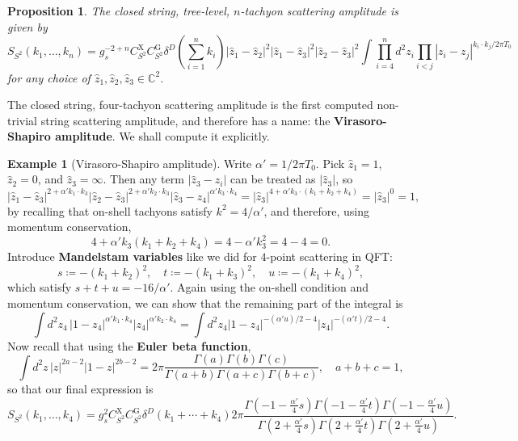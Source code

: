 \documentclass{report}
\theoremstyle{plain}
\newtheorem{proposition}[theorem]{Proposition}
\theoremstyle{definition}
\newtheorem{example}[theorem]{Example}
\theoremstyle{remark}
\newcommand{\bC}{\mathbb{C}}
\begin{document}
\begin{proposition}
  The closed string, tree-level, $n$-tachyon scattering amplitude is
  given by
  \[ S_{S^2}(k_1, \ldots, k_n) = g_s^{-2+n} C_{S^2}^{\text{X}} C_{S^2}^{\text{G}} \delta^D\left(\sum_{i=1}^n k_i\right) |\hat{z}_1 - \hat{z}_2|^2 |\hat{z}_1 - \hat{z}_3|^2 |\hat{z}_2 - \hat{z}_3|^2 \int \prod_{i=4}^n d^2 z_i \prod_{i<j} |z_i - z_j|^{k_i \cdot k_j/2\pi T_0} \]
  for any choice of $\hat{z}_1, \hat{z}_2, \hat{z}_3 \in \bC^2$.
\end{proposition}

The closed string, four-tachyon scattering amplitude is the first
computed non-trivial string scattering amplitude, and therefore has a
name: the {\bf Virasoro-Shapiro amplitude}. We shall compute it
explicitly.

\begin{example}[Virasoro-Shapiro amplitude]
  Write $\alpha' = 1/2\pi T_0$. Pick $\hat{z}_1 = 1$, $\hat{z}_2 = 0$,
  and $\hat{z}_3 = \infty$. Then any term $|\hat{z}_3 - z_i|$ can be
  treated as $|\hat{z}_3|$, so
  \[ |\hat{z}_1 - \hat{z}_3|^{2+\alpha' k_1\cdot k_3}|\hat{z}_2 - \hat{z}_3|^{2+\alpha' k_2 \cdot k_3}|\hat{z}_3 - z_4|^{\alpha' k_3 \cdot k_4} = |\hat{z}_3|^{4 + \alpha' k_3 \cdot (k_1 + k_2 + k_4)} = |\hat{z}_3|^0 = 1, \]
  by recalling that on-shell tachyons satisfy $k^2 = 4/\alpha'$, and
  therefore, using momentum conservation,
  \[ 4 + \alpha' k_3(k_1 + k_2 + k_4) = 4 - \alpha' k_3^2 = 4 - 4 = 0. \]
  Introduce {\bf Mandelstam variables} like we did for $4$-point
  scattering in QFT:
  \[ s \coloneqq -(k_1 + k_2)^2, \quad t \coloneqq -(k_1 + k_3)^2, \quad u \coloneqq -(k_1 + k_4)^2, \]
  which satisfy $s + t + u = -16/\alpha'$. Again using the on-shell
  condition and momentum conservation, we can show that the remaining
  part of the integral is
  \[ \int d^2z_4 \, |1 - z_4|^{\alpha' k_1 \cdot k_4} |z_4|^{\alpha' k_2 \cdot k_4} = \int d^2z_4 |1 - z_4|^{-(\alpha' u)/2 - 4} |z_4|^{-(\alpha' t)/2 - 4}. \]
  Now recall that using the {\bf Euler beta function},
  \[ \int d^2z \, |z|^{2a-2} |1-z|^{2b-2} = 2\pi \frac{\Gamma(a) \Gamma(b) \Gamma(c)}{\Gamma(a+b) \Gamma(a+c) \Gamma(b+c)}, \quad a + b + c = 1, \]
  so that our final expression is
  \[ S_{S^2}(k_1, \ldots, k_4) = g_s^2 C_{S^2}^{\text{X}} C_{S^2}^{\text{G}} \delta^D(k_1 + \cdots + k_4) 2\pi \frac{\Gamma(-1 - \frac{\alpha'}{4} s)\Gamma(-1 - \frac{\alpha'}{4} t)\Gamma(-1 - \frac{\alpha'}{4} u)}{\Gamma(2 + \frac{\alpha'}{4}s)\Gamma(2 + \frac{\alpha'}{4}t)\Gamma(2 + \frac{\alpha'}{4}u)}. \]
\end{example}
\end{document}

